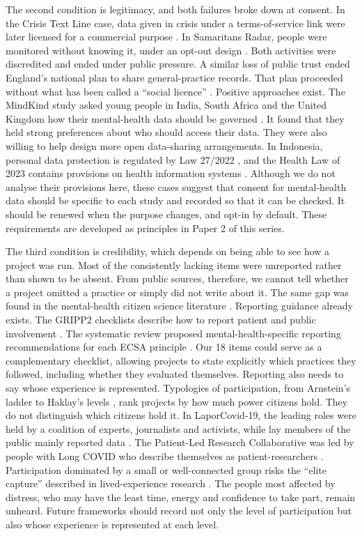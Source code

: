 \documentclass[
  number,
  preprint]{elsarticle}
\begin{document}
The second condition is legitimacy, and both failures broke down at
consent. In the Crisis Text Line case, data given in crisis under a
terms-of-service link were later licensed for a commercial purpose
\citep{eysenbach2025}. In Samaritans Radar, people were monitored
without knowing it, under an opt-out design
\citep{responsibledata_radar}. Both activities were discredited and
ended under public pressure. A similar loss of public trust ended
England's national plan to share general-practice records. That plan
proceeded without what has been called a ``social licence''
\citep{carter2015}. Positive approaches exist. The MindKind study asked
young people in India, South Africa and the United Kingdom how their
mental-health data should be governed \citep{mindkind2022}. It found
that they held strong preferences about who should access their data.
They were also willing to help design more open data-sharing
arrangements. In Indonesia, personal data protection is regulated by Law
27/2022 \citep{uupdp2022}, and the Health Law of 2023 contains
provisions on health information systems \citep{uu17_2023}. Although we
do not analyse their provisions here, these cases suggest that consent
for mental-health data should be specific to each study and recorded so
that it can be checked. It should be renewed when the purpose changes,
and opt-in by default. These requirements are developed as principles in
Paper 2 of this series.

The third condition is credibility, which depends on being able to see
how a project was run. Most of the consistently lacking items were
unreported rather than shown to be absent. From public sources,
therefore, we cannot tell whether a project omitted a practice or simply
did not write about it. The same gap was found in the mental-health
citizen science literature \citep{todowede2023}. Reporting guidance
already exists. The GRIPP2 checklists describe how to report patient and
public involvement \citep{staniszewska2017}. The systematic review
proposed mental-health-specific reporting recommendations for each ECSA
principle \citep{todowede2023}. Our 18 items could serve as a
complementary checklist, allowing projects to state explicitly which
practices they followed, including whether they evaluated themselves.
Reporting also needs to say whose experience is represented. Typologies
of participation, from Arnstein's ladder \citep{arnstein1969} to
Haklay's levels \citep{haklay2013}, rank projects by how much power
citizens hold. They do not distinguish which citizens hold it. In
LaporCovid-19, the leading roles were held by a coalition of experts,
journalists and activists, while lay members of the public mainly
reported data \citep{rinaldi2024, ekawati2022}. The Patient-Led Research
Collaborative was led by people with Long COVID who describe themselves
as patient-researchers \citep{mccorkell2021, fitzgerald2024}.
Participation dominated by a small or well-connected group risks the
``elite capture'' described in lived-experience research
\citep{okoroji2023}. The people most affected by distress, who may have
the least time, energy and confidence to take part, remain unheard.
Future frameworks should record not only the level of participation but
also whose experience is represented at each level.
\end{document}
